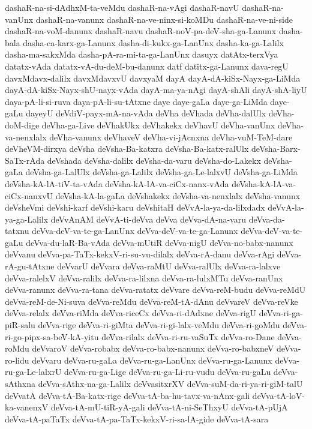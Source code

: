 {dashaR-na-si-dAdhxM-ta-veMdu
dashaR-na-vAgi
dashaR-navU
dashaR-na-vanUnx
dashaR-na-vanunx
dashaR-na-ve-ninx-si-koMDu
dashaR-na-ve-ni-side
dashaR-na-voM-danunx
dashaR-navu
dashaR-noV-pa-deV-sha-ga-Lanunx
dasha-bala
dasha-ca-karx-ga-Lanunx
dasha-di-kukx-ga-LanUnx
dasha-ka-ga-Lalilx
dasha-ma-sakxMda
dasha-pA-ra-mi-ta-ga-LanUnx
dasuyx
datAtx-terxVya
datatx-vAda
datatx-vA-du-deM-bu-danunx
datf
datitx-ga-Lanunx
dava-regU
davxMdavx-dalilx
davxMdavxvU
davxyaM
dayA
dayA-dA-kiSx-Nayx-ga-LiMda
dayA-dA-kiSx-Nayx-shU-nayx-vAda
dayA-ma-ya-nAgi
dayA-shAli
dayA-shA-liyU
daya-pA-li-si-ruva
daya-pA-li-su-tAtxne
daye
daye-gaLa
daye-ga-LiMda
daye-gaLu
dayeyU
deVdiV-payx-mA-na-vAda
deVha
deVhada
deVha-dalUlx
deVha-doM-dige
deVha-ga-Live
deVhakUkx
deVhakekx
deVhavU
deVha-vanUnx
deVha-va-nenxlalx
deVha-vanunx
deVhaveV
deVha-vi-jAcnxna
deVha-vuM-TeM-dare
deVheVM-dirxya
deVsha
deVsha-Ba-katxra
deVsha-Ba-katx-ralUlx
deVsha-Barx-SaTx-rAda
deVshada
deVsha-dalilx
deVsha-da-varu
deVsha-do-Lakekx
deVsha-gaLa
deVsha-ga-LalUlx
deVsha-ga-Lalilx
deVsha-ga-Le-lalxvU
deVsha-ga-LiMda
deVsha-kA-lA-tiV-ta-vAda
deVsha-kA-lA-va-ciCx-nanx-vAda
deVsha-kA-lA-va-ciCx-nanxvU
deVsha-kA-la-gaLa
deVshakekx
deVsha-va-nenxlalx
deVsha-vanunx
deVsheVmi
deVshi-karf
deVshi-karu
deVshitaH
deVvA-la-ya-da-lilxdadx
deVvA-la-ya-ga-Lalilx
deVvAnAM
deVvA-ti-deVva
deVva
deVva-dA-na-varu
deVva-da-tatxnu
deVva-deV-va-te-ga-LanUnx
deVva-deV-va-te-ga-Lanunx
deVva-deV-va-te-gaLu
deVva-du-laR-Ba-vAda
deVva-mUtiR
deVva-nigU
deVva-no-babx-nanunx
deVvanu
deVva-pa-TaTx-kekxV-ri-su-vu-dilalx
deVva-rA-danu
deVva-rAgi
deVva-rA-gu-tAtxne
deVvarU
deVvara
deVva-raMtU
deVva-ralUlx
deVva-ra-lalxve
deVva-ralelxV
deVva-ralilx
deVva-ra-lilxna
deVva-ra-lulxMTu
deVva-ranUnx
deVva-ranunx
deVva-ra-tana
deVva-ratatx
deVvare
deVva-reM-budu
deVva-reMdU
deVva-reM-de-Ni-suva
deVva-reMdu
deVva-reM-tA-dAnu
deVvareV
deVva-reVke
deVva-relalx
deVva-riMda
deVva-riceCx
deVva-ri-dAdxne
deVva-rigU
deVva-ri-ga-piR-salu
deVva-rige
deVva-ri-giMta
deVva-ri-gi-lalx-veMdu
deVva-ri-goMdu
deVva-ri-go-pipx-sa-beV-kA-yitu
deVva-rilalx
deVva-ri-ru-vaSuTx
deVva-ro-Dane
deVva-roMdu
deVvaroV
deVva-robabx
deVva-ro-babx-nanunx
deVva-ro-babxneV
deVva-ro-lidu
deVvaru
deVva-ru-gaLa
deVva-ru-ga-LanUnx
deVva-ru-ga-Lanunx
deVva-ru-ga-Le-lalxrU
deVva-ru-ga-Lige
deVva-ru-ga-Li-ru-vudu
deVva-ru-gaLu
deVva-sAthxna
deVva-sAthx-na-ga-Lalilx
deVvasitxrXV
deVva-suM-da-ri-ya-ri-giM-talU
deVvatA
deVva-tA-Ba-katx-rige
deVva-tA-ba-hu-tavx-va-nAnx-gali
deVva-tA-loV-ka-vanenxV
deVva-tA-mU-tiR-yA-gali
deVva-tA-ni-SeThxyU
deVva-tA-pUjA
deVva-tA-paTaTx
deVva-tA-pa-TaTx-kekxV-ri-sa-lA-gide
deVva-tA-sara
}
